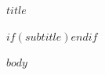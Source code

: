 \documentclass[11pt,a4paper]{article}
\begin{document}
\begin{center}
{\LARGE\bfseries $title$\par}
$if(subtitle)$\vspace{7pt}{\normalsize $subtitle$\par}$endif$
\end{center}
\vspace{7pt}
$body$
\end{document}
